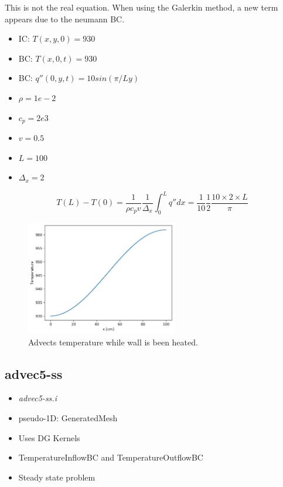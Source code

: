 \documentclass[11pt,letterpaper]{article}
\begin{document}
    This is not the real equation. When using the Galerkin method, a new term appears due to the neumann BC.

	\begin{itemize}
		\item IC: $T(x, y, 0) = 930$
		\item BC: $T(x, 0, t) = 930$
		\item BC: $q''(0, y, t) = 10 sin (\pi/L y)$
		\item $\rho = 1e-2$
		\item $c_p = 2e3$
		\item $v = 0.5$
		\item $L = 100$
		\item $\Delta_x = 2$
	\end{itemize}

	\begin{equation}
	T(L) - T(0) = \frac{1}{\rho c_p v}\frac{1}{\Delta_x}\int^L_0 q'' dx = \frac{1}{10} \frac{1}{2} \frac{10 \times 2 \times L}{\pi}
	\end{equation}

	\begin{figure}[htbp!]
		\centering
		\includegraphics[height=5cm]{advec5-t-251}
		\caption{Advects temperature while wall is been heated.}
		\label{fig:advec5-t}
	\end{figure}

	\subsection{advec5-ss}

	\begin{itemize}
		\item \textit{advec5-ss.i}
		\item pseudo-1D: GeneratedMesh
		\item Uses DG Kernels
		\item TemperatureInflowBC and TemperatureOutflowBC
		\item Steady state problem
	\end{itemize}
\end{document}

